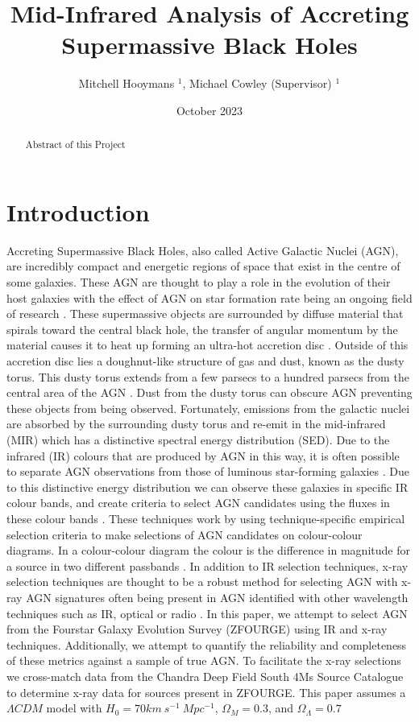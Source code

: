 \documentclass[12pt]{iopart}
\date{October 2023}
\begin{document}
\title{Mid-Infrared Analysis of Accreting Supermassive Black Holes}
\author{Mitchell Hooymans $^1$, Michael Cowley (Supervisor) $^1$}
\address{$^1$ Queensland University of Technology, Brisbane, Australia, 4000}

\begin{abstract}
    Abstract of this Project
\end{abstract}

\ioptwocol
\section{Introduction}
Accreting Supermassive Black Holes, also called Active Galactic Nuclei (AGN), are incredibly compact and energetic regions of space that exist in the centre of some galaxies. These AGN are thought to play a role in the evolution of their host galaxies with the effect of AGN on star formation rate being an ongoing field of research \cite{cowley_zfourge_2016}. These supermassive objects are surrounded by diffuse material that spirals toward the central black hole, the transfer of angular momentum by the material causes it to heat up forming an ultra-hot accretion disc \cite{shakura_black_1973}. Outside of this accretion disc lies a doughnut-like structure of gas and dust, known as the dusty torus. This dusty torus extends from a few parsecs to a hundred parsecs from the central area of the AGN \cite{netzer_revisiting_2015}. Dust from the dusty torus can obscure AGN preventing these objects from being observed. Fortunately, emissions from the galactic nuclei are absorbed by the surrounding dusty torus and re-emit in the mid-infrared (MIR) which has a distinctive spectral energy distribution (SED)\cite{lyu_polar_2018}. Due to the infrared (IR) colours that are produced by AGN in this way, it is often possible to separate AGN observations from those of luminous star-forming galaxies \cite{hickox_obscured_2018}.
Due to this distinctive energy distribution we can observe these galaxies in specific IR colour bands, and create criteria to select AGN candidates using the fluxes in these colour bands \cite{lacy_obscured_2004, stern_midinfrared_2005, donley_identifying_2012, messias_new_2012}. These techniques work by using technique-specific empirical selection criteria to make selections of AGN candidates on colour-colour diagrams. In a colour-colour diagram the colour is the difference in magnitude for a source in two different passbands \cite{bessell_ubvri_1990}. In addition to IR selection techniques, x-ray selection techniques are thought to be a robust method for selecting AGN with x-ray AGN signatures often being present in AGN identified with other wavelength techniques such as IR, optical or radio \cite{brandt_cosmic_2015}. In this paper, we attempt to select AGN from the Fourstar Galaxy Evolution Survey (ZFOURGE) \cite{straatman_fourstar_2016} using IR and x-ray techniques. Additionally, we attempt to quantify the reliability and completeness of these metrics against a sample of true AGN. To facilitate the x-ray selections we cross-match data from the Chandra Deep Field South 4Ms Source Catalogue \cite{xue_chandra_2011} to determine x-ray data for sources present in ZFOURGE. This paper assumes a $\Lambda CDM$ model with $H_0 = 70 km \ s^{-1} \ Mpc^{-1}$, $\Omega_M = 0.3$, and $\Omega_{\Lambda} = 0.7$ 
\end{document}
